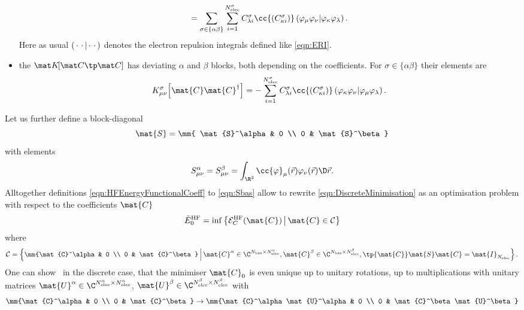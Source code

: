 \begin{rem}
\begin{itemize}
\begin{equation}
					= \sum_{\sigma\in\{\alpha\beta\}}
						\sum_{i=1}^{N_\text{elec}^\sigma}
						C^\sigma_{\lambda i}
						\cc{\left(C^\sigma_{\kappa i}\right)}
						\eriMu{\varphi_{\mu} \varphi_{\nu}}
							{\varphi_{\kappa} \varphi_{\lambda}}.
				\label{eqn:Jbas}
			\end{equation}
			Here as usual $\left( \,\cdot\, \,\cdot\, \middle| \,\cdot\, \,\cdot\, \right)$
			denotes the electron repulsion integrals defined like \eqref{eqn:ERI}.
		\item the  $\matKfull$ has
			deviating $\alpha$ and $\beta$ blocks,
			both depending on the coefficients.
			For $\sigma \in \{\alpha\beta\}$ their elements are
			\begin{equation}
				K_{\mu\nu}^\sigma\!\left[\mat{C}\mat{C}^\dagger\right]
					= - \sum_{i=1}^{N_\text{elec}^\sigma}
						C^\sigma_{\lambda i}
						\cc{\left(C^\sigma_{\kappa i}\right)}
						\eriMu{\varphi_{\kappa} \varphi_{\nu}}
							{\varphi_{\mu} \varphi_{\lambda}}.
				\label{eqn:Kbas}
			\end{equation}
	\end{itemize}
	Let us further define a block-diagonal 
	\[ \mat{S} = \mm{ \mat{S}^\alpha & 0 \\ 0 & \mat{S}^\beta} \]
	with elements
	\begin{equation}
		S^\alpha_{\mu\nu} = S^\beta_{\mu\nu} = \int_{\R^3} \cc{\varphi}_\mu(\vec{r})
			\varphi_{\nu}(\vec{r})\D\vec{r}.
		\label{eqn:Sbas}
	\end{equation}
	Alltogether definitions \eqref{eqn:HFEnergyFunctionalCoeff}
	to \eqref{eqn:Sbas} allow to rewrite \eqref{eqn:DiscreteMinimisation}
	as an optimisation problem with respect to the coefficients $\mat{C}$
	\begin{equation}
		\tilde{E}_0^\text{HF} = \inf \left\{
			\Ehf_C(\mat{C}) \, \middle| \, \mat{C} \in \mathcal{C}
		\right\}
		\label{eqn:HFOptCoeff}
	\end{equation}
	where
	\begin{equation}
		\mathcal{C} = \left\{
			\mm{\mat{C}^\alpha & 0 \\ 0 & \mat{C}^\beta}
			\, \middle| \,
			\mat{C}^\alpha \in \C^{\Nbas\times\NelecA},
			\mat{C}^\beta \in \C^{\Nbas\times\NelecB},
			\tp{\mat{C}} \mat{S} \mat{C} = \mat{I}_{\Nelec}
			\right\}.
		\label{eqn:HFStiefel}
	\end{equation}
	One can show~\cite{Cances2000} in the discrete case,
	that the minimiser $\mat{C}_0$ is even unique
	up to unitary rotations, \ie up to multiplications with unitary matrices
	$\mat{U}^\alpha \in \C^{\NelecA\times\NelecA}$,
	$\mat{U}^\beta \in \C^{\NelecB\times\NelecB}$ with
	\[ \mm{\mat{C}^\alpha & 0 \\ 0 & \mat{C}^\beta}
		\to \mm{\mat{C}^\alpha\mat{U}^\alpha & 0 \\ 0 & \mat{C}^\beta\mat{U}^\beta} \]


\end{rem}

